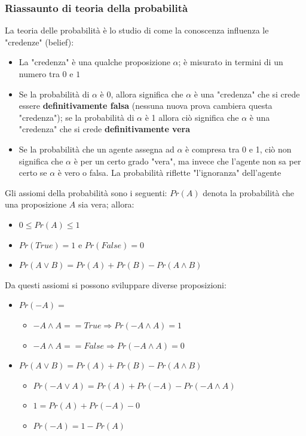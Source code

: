 \documentclass[12pt]{article}
\begin{document}
\subsubsection{Riassaunto di teoria della probabilità}
La teoria delle probabilità è lo studio di come la conoscenza influenza le "credenze" (belief):
\begin{itemize}
    \item La "credenza" è una qualche proposizione $\alpha$; è misurato in termini di un numero tra $0$ e $1$
    \item Se la probabilità di $\alpha$ è $0$, allora significa che $\alpha$ è una "credenza" che si crede essere \textbf{definitivamente falsa} (nessuna nuova prova cambiera questa "credenza");
    se la probabilità di $\alpha$ è 1 allora ciò significa che $\alpha$ è una "credenza" che si crede \textbf{definitivamente vera}
    \item Se la probabilità che un agente assegna ad $\alpha$ è compresa tra 0 e 1, ciò non significa che $\alpha$ è per un certo grado "vera", ma invece che l'agente
    non sa per certo se $\alpha$ è vero o falsa. La probabilità riflette "l'ignoranza" dell'agente
\end{itemize}
Gli assiomi della probabilità sono i seguenti: $Pr(A)$ denota la probabilità che una proposizione $A$ sia vera; allora:
\begin{itemize}
    \item $0 \leq Pr(A) \leq 1$
    \item $Pr(True) = 1$ e $Pr(False) = 0$
    \item $Pr(A \vee B) = Pr(A) + Pr(B) - Pr(A \land B)$
\end{itemize}
Da questi assiomi si possono sviluppare diverse proposizioni:
\begin{itemize}
    \item $Pr(-A) = $ 
    \begin{itemize}
        \item $-A \land A == True \Rightarrow Pr(-A \land A) = 1 $
        \item $-A \land A == False \Rightarrow Pr(-A \land A) = 0 $
    \end{itemize}
    \item $Pr(A \vee B) = Pr(A) + Pr(B) - Pr(A \land B)$
    \begin{itemize}
        \item $Pr(-A \vee A) = Pr(A) + Pr(-A) - Pr(-A \land A)$
        \item $1 = Pr(A) + Pr(-A) - 0$
        \item $Pr(-A) = 1- Pr(A)$
    \end{itemize} 
\end{itemize}
\end{document}

